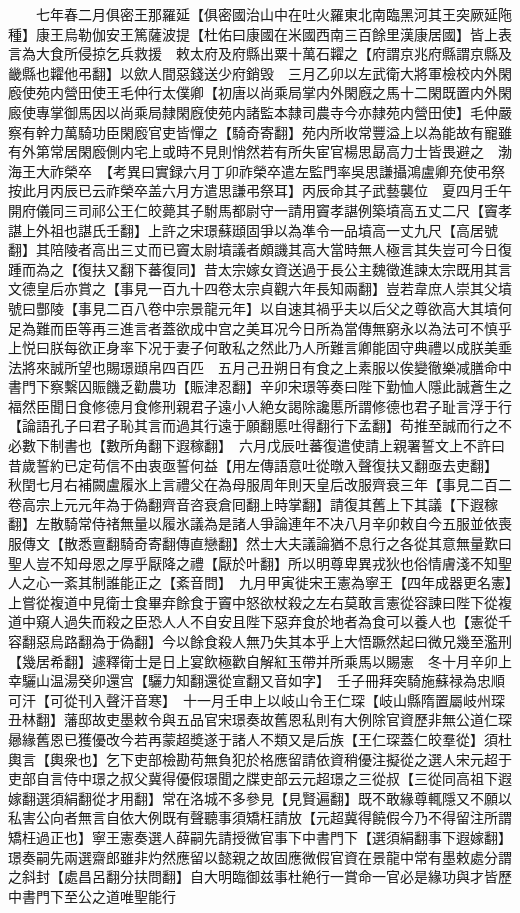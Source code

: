 　　七年春二月俱密王那羅延【俱密國治山中在吐火羅東北南臨黑河其王突厥延陁種】康王烏勒伽安王篤薩波提【杜佑曰康國在米國西南三百餘里漢康居國】皆上表言為大食所侵掠乞兵救援　敕太府及府縣出粟十萬石糶之【府謂京兆府縣謂京縣及畿縣也糶他弔翻】以歛人間惡錢送少府銷毁　三月乙卯以左武衛大將軍檢校内外閑廏使苑内營田使王毛仲行太僕卿【初唐以尚乘局掌内外閑廐之馬十二閑既置内外閑廄使專掌御馬因以尚乘局隸閑廐使苑内諸監本隸司農寺今亦隸苑内營田使】毛仲嚴察有幹力萬騎功臣閑廏官吏皆憚之【騎奇寄翻】苑内所收常豐溢上以為能故有寵雖有外第常居閑廏側内宅上或時不見則悄然若有所失宦官楊思勗高力士皆畏避之　渤海王大祚榮卒　【考異曰實録六月丁卯祚榮卒遣左監門率吳思謙攝鴻盧卿充使弔祭按此月丙辰已云祚榮卒盖六月方遣思謙弔祭耳】丙辰命其子武藝襲位　夏四月壬午開府儀同三司祁公王仁皎薨其子駙馬都尉守一請用竇孝諶例築墳高五丈二尺【竇孝諶上外祖也諶氏壬翻】上許之宋璟蘇頲固爭以為凖令一品墳高一丈九尺【高居號翻】其陪陵者高出三丈而已竇太尉墳議者頗譏其高大當時無人極言其失豈可今日復踵而為之【復扶又翻下蕃復同】昔太宗嫁女資送過于長公主魏徵進諫太宗既用其言文德皇后亦賞之【事見一百九十四卷太宗貞觀六年長知兩翻】豈若韋庶人崇其父墳號曰酆陵【事見二百八卷中宗景龍元年】以自速其禍乎夫以后父之尊欲高大其墳何足為難而臣等再三進言者蓋欲成中宫之美耳况今日所為當傳無窮永以為法可不慎乎上悦曰朕每欲正身率下况于妻子何敢私之然此乃人所難言卿能固守典禮以成朕美埀法將來誠所望也賜璟頲帛四百匹　五月己丑朔日有食之上素服以俟變徹樂减膳命中書門下察繫囚賑饑乏勸農功【賑津忍翻】辛卯宋璟等奏曰陛下勤恤人隱此誠蒼生之福然臣聞日食修德月食修刑親君子遠小人絶女謁除讒慝所謂修德也君子耻言浮于行【論語孔子曰君子恥其言而過其行遠于願翻慝吐得翻行下孟翻】苟推至誠而行之不必數下制書也【數所角翻下遐稼翻】　六月戊辰吐蕃復遣使請上親署誓文上不許曰昔歲誓約已定苟信不由衷亟誓何益【用左傳語意吐從暾入聲復扶又翻亟去吏翻】　秋閏七月右補闕盧履氷上言禮父在為母服周年則天皇后改服齊衰三年【事見二百二卷高宗上元元年為于偽翻齊音咨衰倉囘翻上時掌翻】請復其舊上下其議【下遐稼翻】左散騎常侍禇無量以履氷議為是諸人爭論連年不决八月辛卯敕自今五服並依喪服傳文【散悉亶翻騎奇寄翻傳直戀翻】然士大夫議論猶不息行之各從其意無量歎曰聖人豈不知母恩之厚乎厭降之禮【厭於叶翻】所以明尊卑異戎狄也俗情膚淺不知聖人之心一紊其制誰能正之【紊音問】　九月甲寅徙宋王憲為寧王【四年成器更名憲】上嘗從複道中見衛士食畢弃餘食于竇中怒欲杖殺之左右莫敢言憲從容諫曰陛下從複道中窺人過失而殺之臣恐人人不自安且陛下惡弃食於地者為食可以養人也【憲從千容翻惡烏路翻為于偽翻】今以餘食殺人無乃失其本乎上大悟蹶然起曰微兄幾至濫刑【幾居希翻】遽釋衛士是日上宴飲極歡自解紅玉帶并所乘馬以賜憲　冬十月辛卯上幸驪山温湯癸卯還宫【驪力知翻還從宣翻又音如字】　壬子冊拜突騎施蘇禄為忠順可汗【可從刊入聲汗音寒】　十一月壬申上以岐山令王仁琛【岐山縣隋置屬岐州琛丑林翻】藩邸故吏墨敕令與五品官宋璟奏故舊恩私則有大例除官資歷非無公道仁琛曏緣舊恩已獲優改今若再蒙超奬遂于諸人不類又是后族【王仁琛蓋仁皎羣從】須杜輿言【輿衆也】乞下吏部檢勘苟無負犯於格應留請依資稍優注擬從之選人宋元超于吏部自言侍中璟之叔父冀得優假璟聞之牒吏部云元超璟之三從叔【三從同高祖下遐嫁翻選須絹翻從才用翻】常在洛城不多參見【見賢遍翻】既不敢緣尊輒隱又不願以私害公向者無言自依大例既有聲聽事須矯枉請放【元超冀得饒假今乃不得留注所謂矯枉過正也】寧王憲奏選人薛嗣先請授微官事下中書門下【選須絹翻事下遐嫁翻】璟奏嗣先兩選齋郎雖非灼然應留以懿親之故固應微假官資在景龍中常有墨敕處分謂之斜封【處昌呂翻分扶問翻】自大明臨御兹事杜絶行一賞命一官必是緣功與才皆歷中書門下至公之道唯聖能行